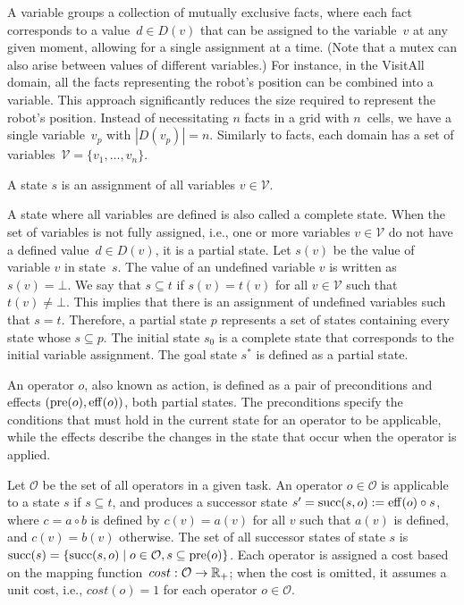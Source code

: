A variable groups a collection of mutually exclusive facts, where each fact corresponds to a value~$d \in D(v)$ that can be assigned to the variable~$v$ at any given moment, allowing for a single assignment at a time. (Note that a mutex can also arise between values of different variables.) For instance, in the VisitAll domain, all the facts representing the robot's position can be combined into a variable. This approach significantly reduces the size required to represent the robot's position. Instead of necessitating $n$ facts in a grid with $n$~cells, we have a single variable~$v_p$ with $|D(v_p)| = n$. Similarly to facts, each domain has a set of variables~$\mathcal{V} = \{v_1,\ldots,v_n\}$.

\begin{definition}[State]\label{def:state}
    A state $s$ is an assignment of all variables $v \in \mathcal{V}$.
\end{definition}

A state where all variables are defined is also called a complete state. When the set of variables is not fully assigned, i.e., one or more variables $v \in \mathcal{V}$ do not have a defined value~$d \in D(v)$, it is a partial state. Let $s(v)$ be the value of variable $v$ in state~$s$. The value of an undefined variable $v$ is written as $s(v) = \bot$. We say that $s \subseteq t$ if $s(v) = t(v)$ for all $v \in \mathcal{V}$ such that $t(v) \neq \bot$. This implies that there is an assignment of undefined variables such that $s = t$. Therefore, a partial state $p$ represents a set of states containing every state whose $s \subseteq p$. The initial state $s_0$ is a complete state that corresponds to the initial variable assignment. The goal state $s^*$ is defined as a partial state.

\begin{definition}[Operator]\label{def:operator}
    An operator $o$, also known as action, is defined as a pair of preconditions and effects $(\operatorname{pre}(o),\operatorname{eff}(o))$, both partial states. The preconditions specify the conditions that must hold in the current state for an operator to be applicable, while the effects describe the changes in the state that occur when the operator is applied.
\end{definition}

Let $\mathcal{O}$ be the set of all operators in a given task. An operator $o \in \mathcal{O}$ is applicable to a state $s$ if $s \subseteq t$, and produces a successor state $s' = \operatorname{succ}(s,o) := \operatorname{eff}(o) \circ s$, where \mbox{$c = a \circ b$} is defined by $c(v) = a(v)$ for all $v$ such that $a(v)$ is defined, and $c(v)=b(v)$ otherwise. The set of all successor states of state $s$ is~$\operatorname{succ}(s)=\{\operatorname{succ}(s,o)\mid o\in \mathcal{O}, s \subseteq \operatorname{pre}(o)\}$. Each operator is assigned a cost based on the mapping function~$cost:\mathcal{O}\rightarrow\mathbb{R}_{+}$; when the cost is omitted, it assumes a unit cost, i.e., $cost(o) = 1$ for each operator $o \in \mathcal{O}$.

